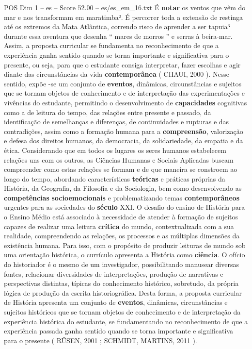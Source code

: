\begin{textsample}{POS Dim 1 – es – Score 52.00 – es/es\_em\_16.txt}
É \textbf{notar} os ventos que vêm do mar e nos transformam em maratimba².
É percorrer toda a extensão de restinga até os extremos da Mata Atlântica, correndo risco de aprender a ser tapuia³ durante essa aventura que desenha “ mares de morros ” e serras à beira-mar.
Assim, a proposta curricular se fundamenta no reconhecimento de que a experiência ganha sentido quando se torna importante e significativa para o presente, ou seja, para que o estudante consiga interpretar, fazer escolhas e agir diante das circunstâncias da vida \textbf{contemporânea} ( CHAUI, 2000 ).
Nesse sentido, expõe -se um conjunto de \textbf{eventos}, dinâmicas, circunstâncias e sujeitos que se tornam objetos de conhecimento e de interpretação das experimentações e vivências do estudante, permitindo o desenvolvimento de \textbf{capacidades} cognitivas como a de leitura do tempo, das relações entre presente e passado, da identificação de semelhanças e diferenças, de continuidades e rupturas e das contradições, assim como a formação humana para a \textbf{compreensão}, valorização e defesa dos direitos humanos, da democracia, da solidariedade, da empatia e da ética.
Considerando que em todos os lugares os seres humanos estabelecem relações uns com os outros, as Ciências Humanas e Sociais Aplicadas buscam compreender como estas relações se formam e de que maneira se constroem ao longo do tempo, abordando características \textbf{teóricas} e práticas próprias da História, da Geografia, da Filosofia e da Sociologia, bem como desenvolvendo as \textbf{competências} \textbf{socioemocionais} e problematizando temas \textbf{contemporâneos} urgentes para as sociedades do \textbf{século} XXI.
O desafio do ensino de História para o Ensino Médio está associado à necessidade de atender à formação de sujeitos capazes de realizar uma leitura \textbf{crítica} do mundo, contextualizada com a sua realidade, compreendendo as relações, os processos e as múltiplas dimensões da existência humana.
Para isso, com o propósito de produzir leituras de mundo sob uma orientação histórica, o currículo apresenta a História como \textbf{ciência}.
O ofício do historiador é o mesmo de um investigador, possibilitando manusear diversas fontes, relacionar diversidades de interpretações, produção de narrativas e perspectivas distintas, típicas do conhecimento histórico, sobretudo, da própria lógica de produção da escrita historiográfica.
Desta forma, a proposta curricular de História apresenta um conjunto de \textbf{eventos}, dinâmicas, circunstâncias e sujeitos históricos que se tornam objetos de conhecimento e de interpretação da experiência histórica do estudante, se fundamentando no reconhecimento de que a experiência passada ganha sentido quando se torna importante e significativa para o presente ( RÜSEN, 2001 ; SCHMIDT, MARTINS, 2011 ).

\end{textsample}
